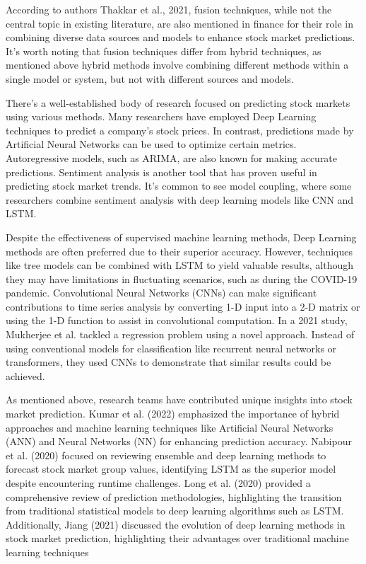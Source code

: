 \documentclass[conference]{IEEEtran}
\begin{document}
According to authors Thakkar et al., 2021, fusion techniques, while not the central topic in existing literature, are also mentioned in finance for their role in combining diverse data sources and models to enhance stock market predictions. It's worth noting that fusion techniques differ from hybrid techniques, as mentioned above hybrid methods involve combining different methods within a single model or system, but not with different sources and models\cite{Thakkar2021}.

There’s a well-established body of research focused on predicting stock markets using various methods. Many researchers have employed Deep Learning techniques to predict a company’s stock prices. In contrast, predictions made by Artificial Neural Networks can be used to optimize certain metrics. Autoregressive models, such as ARIMA, are also known for making accurate predictions. Sentiment analysis is another tool that has proven useful in predicting stock market trends. It’s common to see model coupling, where some researchers combine sentiment analysis with deep learning models like CNN and LSTM\cite{Rouf2021}. 

Despite the effectiveness of supervised machine learning methods, Deep Learning methods are often preferred due to their superior accuracy. However, techniques like tree models can be combined with LSTM to yield valuable results, although they may have limitations in fluctuating scenarios, such as during the COVID-19 pandemic. Convolutional Neural Networks (CNNs) can make significant contributions to time series analysis by converting 1-D input into a 2-D matrix or using the 1-D function to assist in convolutional computation. In a 2021 study, Mukherjee et al. tackled a regression problem using a novel approach. Instead of using conventional models for classification like recurrent neural networks or transformers, they used CNNs to demonstrate that similar results could be achieved\cite{Rouf2021}.

As mentioned above, research teams have contributed unique insights into stock market prediction. Kumar et al. (2022) emphasized the importance of hybrid approaches and machine learning techniques like Artificial Neural Networks (ANN) and Neural Networks (NN) for enhancing prediction accuracy\cite{kumar2022}. Nabipour et al. (2020) focused on reviewing ensemble and deep learning methods to forecast stock market group values, identifying LSTM as the superior model despite encountering runtime challenges\cite{Nabipor2020}. Long et al. (2020) provided a comprehensive review of prediction methodologies, highlighting the transition from traditional statistical models to deep learning algorithms such as LSTM\cite{Long2020}. Additionally, Jiang (2021) discussed the evolution of deep learning methods in stock market prediction, highlighting their advantages over traditional machine learning techniques \cite{Jiang2021}
\end{document}
